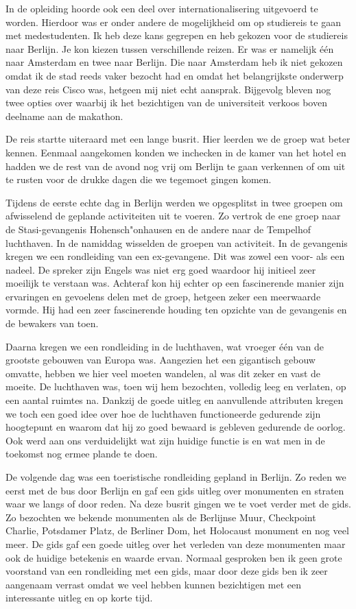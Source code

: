 
In de opleiding hoorde ook een deel over internationalisering uitgevoerd te worden. Hierdoor was er onder andere de mogelijkheid om op studiereis te gaan met medestudenten. Ik heb deze kans gegrepen en heb gekozen voor de studiereis naar Berlijn. Je kon kiezen tussen verschillende reizen. Er was er namelijk één naar Amsterdam en twee naar Berlijn. Die naar Amsterdam heb ik niet gekozen omdat ik de stad reeds vaker bezocht had en omdat het belangrijkste onderwerp van deze reis Cisco was, hetgeen mij niet echt aansprak. Bijgevolg bleven nog twee opties over waarbij ik het bezichtigen van de universiteit verkoos boven deelname aan de makathon.

De reis startte uiteraard met een lange busrit. Hier leerden we de groep wat beter kennen. Eenmaal aangekomen konden we inchecken in de kamer van het hotel en hadden we de rest van de avond nog vrij om Berlijn te gaan verkennen of om uit te rusten voor de drukke dagen die we tegemoet gingen komen.

Tijdens de eerste echte dag in Berlijn werden we opgesplitst in twee groepen om afwisselend de geplande activiteiten uit te voeren. Zo vertrok de ene groep naar de Stasi\hyp{}gevangenis Hohensch"onhausen en de andere naar de Tempelhof luchthaven. In de namiddag wisselden de groepen van activiteit. In de gevangenis kregen we een rondleiding van een ex\hyp{}gevangene. Dit was zowel een voor\hyp{} als een nadeel. De spreker zijn Engels was niet erg goed waardoor hij initieel zeer moeilijk te verstaan was. Achteraf kon hij echter op een fascinerende manier zijn ervaringen en gevoelens delen met de groep, hetgeen zeker een meerwaarde vormde. Hij had een zeer fascinerende houding ten opzichte van de gevangenis en de bewakers van toen.

Daarna kregen we een rondleiding in de luchthaven, wat vroeger één van de grootste gebouwen van Europa was. Aangezien het een gigantisch gebouw omvatte, hebben we hier veel moeten wandelen, al was dit zeker en vast de moeite. De luchthaven was, toen wij hem bezochten, volledig leeg en verlaten, op een aantal ruimtes na. Dankzij de goede uitleg en aanvullende attributen kregen we toch een goed idee over hoe de luchthaven functioneerde gedurende zijn hoogtepunt en waarom dat hij zo goed bewaard is gebleven gedurende de oorlog. Ook werd aan ons verduidelijkt wat zijn huidige functie is en wat men in de toekomst nog ermee plande te doen.

De volgende dag was een toeristische rondleiding gepland in Berlijn. Zo reden we eerst met de bus door Berlijn en gaf een gids uitleg over monumenten en straten waar we langs of door reden. Na deze busrit gingen we te voet verder met de gids. Zo bezochten we bekende monumenten als de Berlijnse Muur, Checkpoint Charlie, Potsdamer Platz, de Berliner Dom, het Holocaust monument en nog veel meer. De gids gaf een goede uitleg over het verleden van deze monumenten maar ook de huidige betekenis en waarde ervan. Normaal gesproken ben ik geen grote voorstand van een rondleiding met een gids, maar door deze gids ben ik zeer aangenaam verrast omdat we veel hebben kunnen bezichtigen met een interessante uitleg en op korte tijd.

